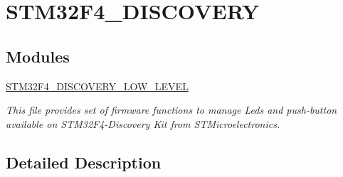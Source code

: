 \hypertarget{group__STM32F4__DISCOVERY}{\section{S\-T\-M32\-F4\-\_\-\-D\-I\-S\-C\-O\-V\-E\-R\-Y}
\label{group__STM32F4__DISCOVERY}
}
\subsection*{Modules}
\begin{DoxyCompactItemize}
\item 
\hyperlink{group__STM32F4__DISCOVERY__LOW__LEVEL}{S\-T\-M32\-F4\-\_\-\-D\-I\-S\-C\-O\-V\-E\-R\-Y\-\_\-\-L\-O\-W\-\_\-\-L\-E\-V\-E\-L}
\begin{DoxyCompactList}\small\item\em This file provides set of firmware functions to manage Leds and push-\/button available on S\-T\-M32\-F4-\/\-Discovery Kit from S\-T\-Microelectronics. \end{DoxyCompactList}\end{DoxyCompactItemize}


\subsection{Detailed Description}
